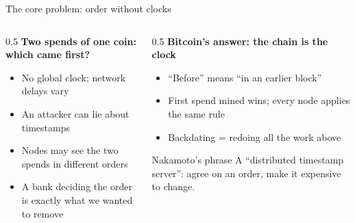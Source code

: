 \ifdefined\PRESENTATION\else\PassOptionsToClass{handout}{beamer}\fi\documentclass[aspectratio=169, lualatex]{beamer}
\begin{document}
\begin{frame}{The core problem: order without clocks}
	\begin{columns}[c]
		\begin{column}{0.5\textwidth}
			\textbf{Two spends of one coin: which came first?}
			\begin{itemize}
				\item No global clock; network delays vary
				\item An attacker can lie about timestamps
				\item Nodes may see the two spends in different orders
				\item A bank deciding the order is exactly what we wanted to remove
			\end{itemize}
		\end{column}
		\begin{column}{0.5\textwidth}
			\textbf{Bitcoin's answer: the chain is the clock}
			\begin{itemize}
				\item ``Before'' means ``in an earlier block''
				\item First spend mined wins; every node applies the same rule
				\item Backdating = redoing all the work above
			\end{itemize}
			\begin{exampleblock}{Nakamoto's phrase}
				A ``distributed timestamp server'': agree on an order, make it expensive to change.
			\end{exampleblock}
		\end{column}
	\end{columns}
\end{frame}
\end{document}
